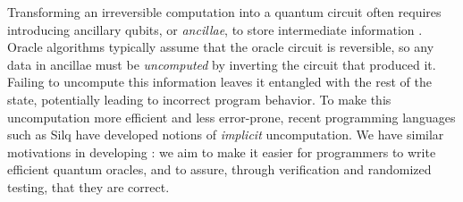 Transforming an irreversible computation into a quantum circuit often requires introducing ancillary qubits, or \emph{ancillae}, to store intermediate information \cite[Chapter 3.2]{mike-and-ike}.
Oracle algorithms typically assume that the oracle circuit is reversible, so any data in ancillae must be \emph{uncomputed} by inverting the circuit that produced it.
Failing to uncompute this information leaves it entangled with the rest of the state, potentially leading to incorrect program behavior.
To make this uncomputation more efficient and less error-prone, recent programming languages such as Silq \cite{sliqlanguage} have developed notions of \emph{implicit} uncomputation.
We have similar motivations in developing \name: we aim to make it easier for programmers to write efficient quantum oracles, and to assure, through verification and randomized testing, that they are correct.

